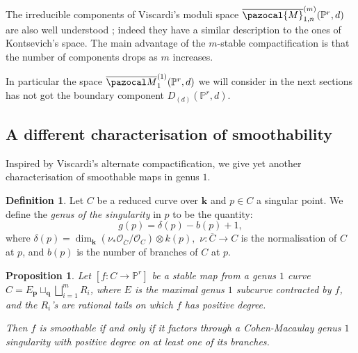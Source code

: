 \documentclass[11pt]{amsart}
\newcommand{\Mone}[3]{\overline{\pazocal M}^{(1)}_{#1}(#2,#3)}
\newcommand{\PP}{\mathbb P}
\renewcommand{\k}{\mathbf k}
\newcommand{\OO}{\mathcal O}
\renewcommand{\to}{\rightarrow}
\theoremstyle{plain}
\newtheorem{prop}[thm]{Proposition}
\newtheorem{cor}[thm]{Corollary}
\theoremstyle{definition}
\newtheorem{dfn}[thm]{Definition}
\begin{document}
The irreducible components of Viscardi's moduli space $\overline{\pazocal{M}}^{(m)}_{1,n}(\PP^r,d)$ are also well understood \cite[Thm.~5.9]{VISC}; indeed they have a similar description to the ones of Kontsevich's space. The main advantage of the $m$-stable compactification is that the number of components drops as $m$ increases.

In particular the space $\Mone{1}{\PP^r}{d}$ we will consider in the next sections has not got the boundary component $D_{(d)}(\PP^r,d)$.
 
 \subsection{A different characterisation of smoothability}
 Inspired by Viscardi's alternate compactification, we give yet another characterisation of smoothable maps in genus $1.$
 \begin{dfn}
 Let $C$ be a reduced curve over $\k$ and $p\in C$ a singular point. We define the \emph{genus of the singularity} in $p$ to be the quantity: \[g(p)=\delta(p)-b(p)+1,\] where $\delta(p)=\dim_{\k}(\nu_*\OO_{\overline C}/\OO_C)\otimes k(p),$ $\nu\colon\overline{C}\to C$ is the normalisation of $C$ at $p$, and $b(p)$ is the number of branches of $C$ at $p.$
 \end{dfn}

 \begin{prop}\label{prop:smoothability2}
 Let $[f\colon C\to \PP^r]$ be a stable map from a genus $1$ curve $C=E {}_{\mathbf p}\!\sqcup_{\mathbf q}\bigsqcup_{i=1}^m R_i$, where $E$ is the maximal genus $1$ subcurve contracted by $f$, and the $R_i$'s are rational tails on which $f$ has positive degree. 
  
  Then $f$ is smoothable if and only if it factors through a Cohen-Macaulay genus $1$ singularity with positive degree on at least one of its branches.
\end{prop}
\end{document}
